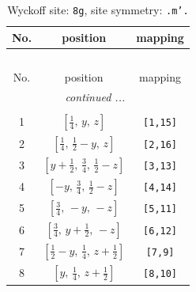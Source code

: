 \documentclass[fleqn,8pt]{jsarticle}
\begin{document}
\begin{longtable}{ccc}
\caption{Wyckoff site: {\tt 8g}, site symmetry: {\tt .m'.}}
 \\
 \hline \hline
No. & position & mapping \\ \hline \endfirsthead

\multicolumn{2}{l}{\tablename\ \thetable{}} \\
 \hline \hline
No. & position & mapping \\ \hline \endhead

 \hline \hline
\multicolumn{2}{r}{\footnotesize\it continued ...} \\ \endfoot

 \hline \hline
\multicolumn{2}{r}{} \\ \endlastfoot

1 & $\left[ \frac{1}{4},\, y,\, z \right]$ & {\tt [1,15]} \\ \hline
2 & $\left[ \frac{1}{4},\, \frac{1}{2} - y,\, z \right]$ & {\tt [2,16]} \\ \hline
3 & $\left[ y + \frac{1}{2},\, \frac{3}{4},\, \frac{1}{2} - z \right]$ & {\tt [3,13]} \\ \hline
4 & $\left[ - y,\, \frac{3}{4},\, \frac{1}{2} - z \right]$ & {\tt [4,14]} \\ \hline
5 & $\left[ \frac{3}{4},\, - y,\, - z \right]$ & {\tt [5,11]} \\ \hline
6 & $\left[ \frac{3}{4},\, y + \frac{1}{2},\, - z \right]$ & {\tt [6,12]} \\ \hline
7 & $\left[ \frac{1}{2} - y,\, \frac{1}{4},\, z + \frac{1}{2} \right]$ & {\tt [7,9]} \\ \hline
8 & $\left[ y,\, \frac{1}{4},\, z + \frac{1}{2} \right]$ & {\tt [8,10]} \\
\end{longtable}
\renewcommand{\arraystretch}{1.2}
\end{document}
